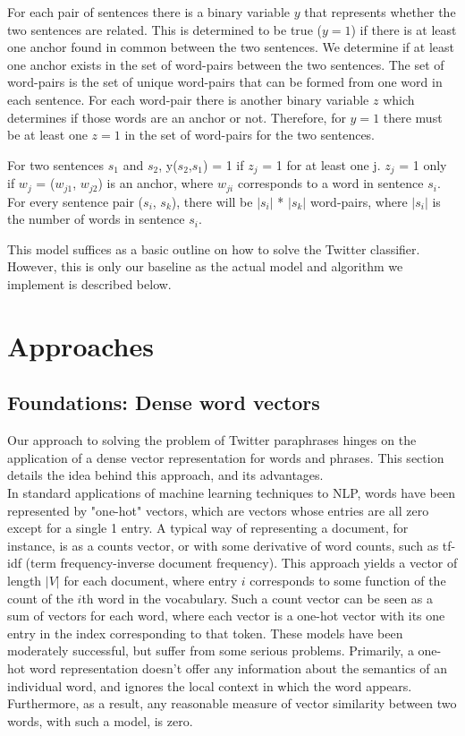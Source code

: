 \documentclass[conference]{IEEEtran}
\begin{document}
For each pair of sentences there is a binary variable $y$ that represents whether the two sentences are related. This is determined to be true ($y=1$) if there is at least one anchor found in common between the two sentences. We determine if at least one anchor exists in the set of word-pairs between the two sentences. The set of word-pairs is the set of unique word-pairs that can be formed from one word in each sentence. For each word-pair there is another binary variable $z$ which determines if those words are an anchor or not. Therefore, for $y=1$ there must be at least one $z=1$ in the set of word-pairs for the two sentences.  \medskip


For two sentences $s_{1}$ and $s_{2}$, y($s_{2}$,$s_{1}$) = 1 
if $z_{j}$ = 1 for at least one j. $z_{j}$ = 1 only if $w_{j}$ = ($w_{j1}$, $w_{j2}$) is an anchor, where $w_{ji}$ corresponds to a word in sentence $s_{i}$. For every sentence pair ($s_{i}$, $s_{k}$), there will be $|s_{i}|$ * $|s_{k}|$ word-pairs, where $|s_{i}|$ is the number of words in sentence $s_{i}$. \medskip

This model suffices as a basic outline on how to solve the Twitter classifier. However, this is only our baseline as the actual model and algorithm we implement is described below.
 
 \section{Approaches}
\subsection{Foundations: Dense word vectors}
\noindent Our approach to solving the problem of Twitter paraphrases hinges on the application of a dense vector representation for words and phrases.  This section details the idea behind this approach, and its advantages.\\

\indent In standard applications of machine learning techniques to NLP, words have been represented by "one-hot" vectors, which are vectors whose entries are all zero except for a single 1 entry. A typical way of representing a document, for instance, is as a counts vector, or with some derivative of word counts, such as tf-idf (term frequency-inverse document frequency).  This approach yields a vector of length $|V|$ for each document, where entry $i$ corresponds to some function of the count of the $i$th word in the vocabulary.  Such a count vector can be seen as a sum of vectors for each word, where each vector is a one-hot vector with its one entry in the index corresponding to that token.  These models have been moderately successful, but suffer from some serious problems. Primarily, a one-hot word representation  doesn't offer any information about the semantics of an individual word, and ignores the local context in which the word appears. Furthermore, as a result, any reasonable measure of vector similarity between two words, with such a model, is zero.\\
\end{document}
